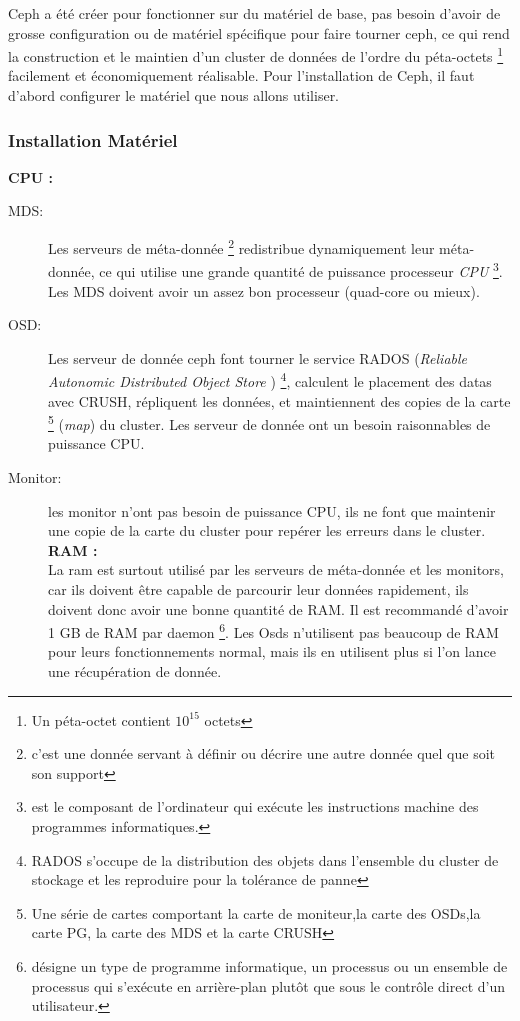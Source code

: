 \documentclass[12pt]{article}
\begin{document}
	Ceph a été créer pour fonctionner sur du matériel de base, pas besoin d'avoir de grosse configuration ou de matériel spécifique pour faire tourner ceph, ce qui rend la construction et le maintien d'un cluster de données de l'ordre du péta-octets \footnote{Un péta-octet contient \begin{math}10^{15}\end{math} octets} facilement et économiquement réalisable.
	Pour l'installation de Ceph, il faut d'abord configurer le matériel que nous allons utiliser.

 \subsubsection{Installation Matériel }	
	
 \textbf{CPU :}
	\begin{description}
 \item[MDS:]  Les serveurs de méta-donnée \footnote{c'est une donnée servant à définir ou décrire une autre donnée quel que soit son support} redistribue dynamiquement leur méta-donnée, ce qui utilise une grande quantité de puissance processeur \textit{CPU} \footnote{est le composant de l'ordinateur qui exécute les instructions machine des programmes informatiques.}. Les MDS doivent avoir un assez bon processeur (quad-core ou mieux).
 \item[OSD:] Les serveur de donnée ceph font tourner le service RADOS (\textit{Reliable Autonomic Distributed Object Store} ) \footnote{RADOS s'occupe de la distribution des objets dans l'ensemble du cluster de stockage et les reproduire pour la tolérance de panne}, calculent le placement des datas avec CRUSH, répliquent les données, et maintiennent des copies de la carte \footnote{Une série de cartes comportant la carte de moniteur,la carte des OSDs,la carte PG, la carte des MDS et la carte CRUSH} (\textit{map}) du cluster. Les serveur de donnée ont un besoin raisonnables de puissance CPU.
\item[Monitor:]les monitor n'ont pas besoin de puissance CPU, ils ne font que maintenir une copie de la carte du cluster pour repérer les erreurs dans le cluster.\\
	
\textbf{RAM :}
	\\La ram est surtout utilisé par les serveurs de méta-donnée et les monitors, car ils doivent être capable de parcourir leur données rapidement, ils doivent donc avoir une bonne quantité de RAM. Il est recommandé d'avoir 1 GB de RAM par daemon \footnote{désigne un type de programme informatique, un processus ou un ensemble de processus qui s'exécute en arrière-plan plutôt que sous le contrôle direct d'un utilisateur.}.
	Les Osds n'utilisent pas beaucoup de RAM pour leurs fonctionnements normal, mais ils en utilisent plus si l'on lance une récupération de donnée.
		\end{description}
		
\end{document}
